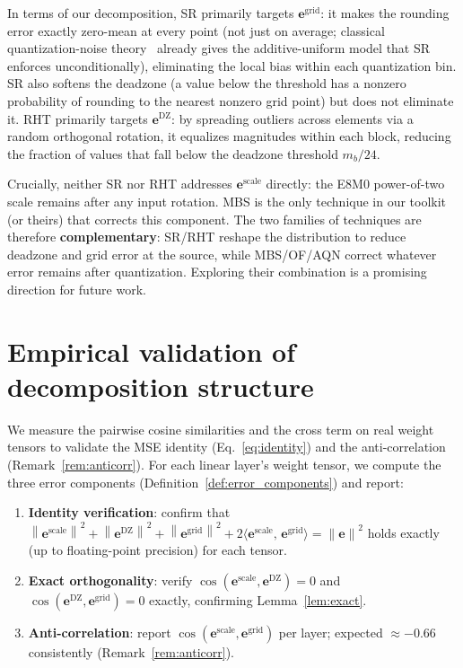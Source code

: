 \documentclass{article}
\theoremstyle{definition}
\theoremstyle{remark}
\newcommand{\be}{\bm{e}}
\newcommand{\norm}[1]{\left\|#1\right\|}
\newcommand{\inner}[2]{\langle #1,\, #2 \rangle}
\begin{document}
In terms of our decomposition, SR primarily targets $\be^{\mathrm{grid}}$: it makes the rounding error exactly zero-mean at every point (not just on average; classical quantization-noise theory~\citep{bennett1948,widrow2008quantization} already gives the additive-uniform model that SR enforces unconditionally), eliminating the local bias within each quantization bin. SR also softens the deadzone (a value below the threshold has a nonzero probability of rounding to the nearest nonzero grid point) but does not eliminate it. RHT primarily targets $\be^{\mathrm{DZ}}$: by spreading outliers across elements via a random orthogonal rotation, it equalizes magnitudes within each block, reducing the fraction of values that fall below the deadzone threshold $m_b/24$.

Crucially, neither SR nor RHT addresses $\be^{\mathrm{scale}}$ directly: the E8M0 power-of-two scale remains after any input rotation. MBS is the only technique in our toolkit (or theirs) that corrects this component. The two families of techniques are therefore \textbf{complementary}: SR/RHT reshape the distribution to reduce deadzone and grid error at the source, while MBS/OF/AQN correct whatever error remains after quantization. Exploring their combination is a promising direction for future work.

\section{Empirical validation of decomposition structure}
\label{app:empirical_orth}

We measure the pairwise cosine similarities and the cross term on real weight tensors to validate the MSE identity (Eq.~\ref{eq:identity}) and the anti-correlation (Remark~\ref{rem:anticorr}). For each linear layer's weight tensor, we compute the three error components (Definition~\ref{def:error_components}) and report:

\begin{enumerate}
\item \textbf{Identity verification}: confirm that $\norm{\be^{\mathrm{scale}}}^2 + \norm{\be^{\mathrm{DZ}}}^2 + \norm{\be^{\mathrm{grid}}}^2 + 2\inner{\be^{\mathrm{scale}}}{\be^{\mathrm{grid}}} = \norm{\be}^2$ holds exactly (up to floating-point precision) for each tensor.
\item \textbf{Exact orthogonality}: verify $\cos(\be^{\mathrm{scale}}, \be^{\mathrm{DZ}}) = 0$ and $\cos(\be^{\mathrm{DZ}}, \be^{\mathrm{grid}}) = 0$ exactly, confirming Lemma~\ref{lem:exact}.
\item \textbf{Anti-correlation}: report $\cos(\be^{\mathrm{scale}}, \be^{\mathrm{grid}})$ per layer; expected $\approx -0.66$ consistently (Remark~\ref{rem:anticorr}).
\end{enumerate}
\end{document}
